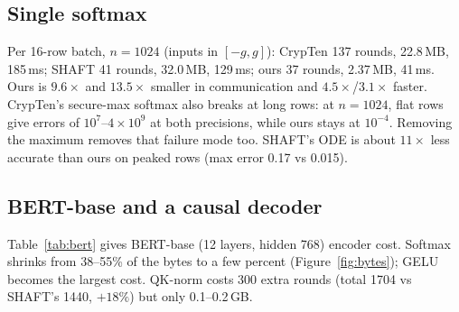 \documentclass[11pt]{article}
\begin{document}
\subsection{Single softmax}
Per 16-row batch, $n=1024$ (inputs in $[-g,g]$): CrypTen 137 rounds, 22.8\,MB, 185\,ms;
SHAFT 41 rounds, 32.0\,MB, 129\,ms; ours 37 rounds, 2.37\,MB, 41\,ms. Ours is
$9.6\times$ and $13.5\times$ smaller in communication and $4.5\times$/$3.1\times$ faster.
CrypTen's secure-max softmax also breaks at long rows: at $n=1024$, flat rows give errors of
$10^{7}$--$4\times10^{9}$ at both precisions, while ours stays at $10^{-4}$. Removing the maximum
removes that failure mode too. SHAFT's ODE is about $11\times$ less accurate than ours on peaked
rows (max error 0.17 vs 0.015).

\subsection{BERT-base and a causal decoder}
Table~\ref{tab:bert} gives BERT-base (12 layers, hidden 768) encoder cost. Softmax shrinks from
38--55\% of the bytes to a few percent (Figure~\ref{fig:bytes}); GELU becomes the largest cost.
QK-norm costs 300 extra rounds (total 1704 vs SHAFT's 1440, $+18\%$) but only 0.1--0.2\,GB.
\end{document}
